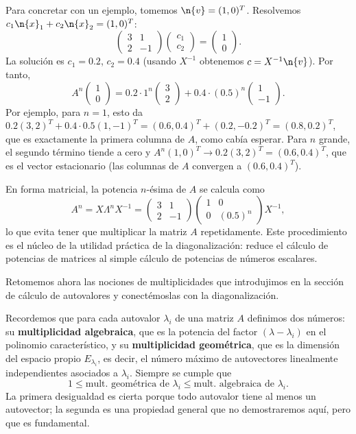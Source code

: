 Para concretar con un ejemplo, tomemos \(\n{v} = (1,0)^T\). Resolvemos \(c_1 \n{x}_1 + c_2 \n{x}_2 = (1,0)^T\):
\[
\begin{pmatrix} 3 & 1 \\ 2 & -1 \end{pmatrix} \begin{pmatrix} c_1 \\ c_2 \end{pmatrix} = \begin{pmatrix} 1 \\ 0 \end{pmatrix}.
\]
La solución es \(c_1 = 0.2\), \(c_2 = 0.4\) (usando \(X^{-1}\) obtenemos \(c = X^{-1}\n{v}\)). Por tanto,
\[
A^n \begin{pmatrix}1\\0\end{pmatrix} = 0.2 \cdot 1^n \begin{pmatrix}3\\2\end{pmatrix} + 0.4 \cdot (0.5)^n \begin{pmatrix}1\\-1\end{pmatrix}.
\]
Por ejemplo, para \(n=1\), esto da \(0.2(3,2)^T + 0.4\cdot 0.5(1,-1)^T = (0.6,0.4)^T + (0.2,-0.2)^T = (0.8,0.2)^T\), que es exactamente la primera columna de \(A\), como cabía esperar. Para \(n\) grande, el segundo término tiende a cero y \(A^n (1,0)^T \to 0.2(3,2)^T = (0.6,0.4)^T\), que es el vector estacionario (las columnas de \(A\) convergen a \((0.6,0.4)^T\)).

En forma matricial, la potencia \(n\)-ésima de \(A\) se calcula como
\[
A^n = X \Lambda^n X^{-1} = \begin{pmatrix} 3 & 1 \\ 2 & -1 \end{pmatrix}
\begin{pmatrix} 1 & 0 \\ 0 & (0.5)^n \end{pmatrix}
X^{-1},
\]
lo que evita tener que multiplicar la matriz \(A\) repetidamente. Este procedimiento es el núcleo de la utilidad práctica de la diagonalización: reduce el cálculo de potencias de matrices al simple cálculo de potencias de números escalares.




Retomemos ahora las nociones de multiplicidades que introdujimos en la sección de cálculo de autovalores y conectémoslas con la diagonalización.

Recordemos que para cada autovalor $\lambda_i$ de una matriz $A$ definimos dos números: su \textbf{multiplicidad algebraica}, que es la potencia del factor $(\lambda - \lambda_i)$ en el polinomio característico, y su \textbf{multiplicidad geométrica}, que es la dimensión del espacio propio $E_{\lambda_i}$, es decir, el número máximo de autovectores linealmente independientes asociados a $\lambda_i$. Siempre se cumple que
\[
1 \le \text{mult. geométrica de } \lambda_i \le \text{mult. algebraica de } \lambda_i.
\]
La primera desigualdad es cierta porque todo autovalor tiene al menos un autovector; la segunda es una propiedad general que no demostraremos aquí, pero que es fundamental.

